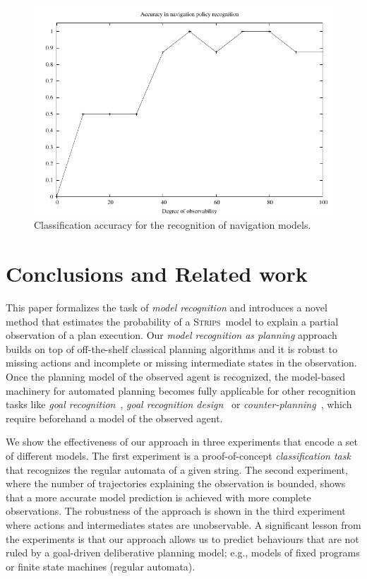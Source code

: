 \documentclass[letterpaper]{article} %
\newcommand{\strips}{\textsc{Strips}}     %
\begin{document}
\begin{figure}
	\centering
	\includegraphics[width=.95\columnwidth]{fig_navigation.pdf}
	\caption{Classification accuracy for the recognition of navigation models.}
	\label{fig:navigation_acc}
\end{figure}



\section{Conclusions and Related work}
\label{sec:related}


This paper formalizes the task of {\em model recognition} and introduces a novel method that estimates the probability of a \strips\ model to explain a partial observation of a plan execution. Our {\em model recognition as planning} approach builds on top of off-the-shelf classical planning algorithms and it is robust to missing actions and incomplete or missing intermediate states in the observation. Once the planning model of the observed agent is recognized, the model-based machinery for automated planning becomes fully applicable for other recognition tasks like {\em goal recognition}~\cite{RamirezG10,ramirez2012plan}, {\em goal recognition design}~\cite{KerenGK14} or {\em counter-planning}~\cite{PozancoEFB18}, which require beforehand a model of the observed agent.

We show the effectiveness of our approach in three experiments that encode a set of different models.
The first experiment is a proof-of-concept \emph{classification task} that recognizes the regular automata of a given string. The second experiment, where the number of trajectories explaining the observation is bounded, shows that a more accurate model prediction is achieved with more complete observations. The robustness of the approach is shown in the third experiment where actions and intermediates states are unobservable. A significant lesson from the experiments is that our approach allows us to predict behaviours that are not ruled by a goal-driven deliberative planning model; e.g., models of fixed programs or finite state machines (regular automata).
\end{document}
